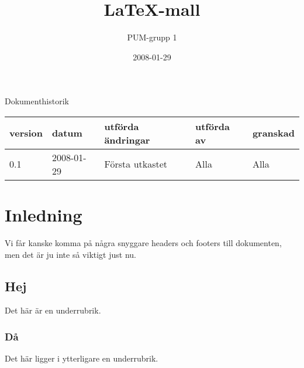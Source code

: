 

\ifpdf
\else
\fi

\title{LaTeX-mall}
\author{PUM-grupp 1}
\date{2008-01-29}



\maketitle\thispagestyle{empty}

\newpage

{\centering \Large{Dokumenthistorik\\}}

\vspace{10pt}
\begin{tabularx}{\textwidth}{ |l|l|X|l|l| }
  \hline
    \textbf{version} & \textbf{datum} & \textbf{utförda ändringar} & \textbf{utförda av} & \textbf{granskad} \\
	\hline 
  0.1 & 2008-01-29 &  Första utkastet  & Alla & Alla   \\
  \hline
\end{tabularx}

\newpage

\setcounter{tocdepth}{2}
\tableofcontents
\newpage

\section{Inledning}

Vi får kanske komma på några snyggare headers och footers till dokumenten, men det är ju inte så viktigt just nu.

\subsection{Hej}

Det här är en underrubrik.

\subsubsection{Då}

Det här ligger i ytterligare en underrubrik.


